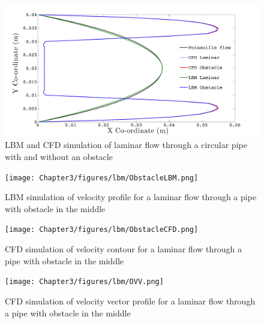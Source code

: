\begin{figure}[htbp]
\centering
\includegraphics[scale=0.4]{Chapter3/figures/lbm/LBMCFD.pdf}
\caption{LBM and CFD simulation of laminar flow through a circular pipe with and without an obstacle}
\label{fig:LBM}
\end{figure}

\begin{figure}[htbp]
\centering
\texttt{[image: Chapter3/figures/lbm/ObstacleLBM.png]}
\caption{LBM simulation of velocity profile for a laminar flow through a pipe with obstacle in the middle}
\label{fig:Obstacle}
\end{figure}

\begin{figure}[htbp]
\centering
\texttt{[image: Chapter3/figures/lbm/ObstacleCFD.png]}
\caption{CFD simulation of velocity contour for a laminar flow through a pipe with obstacle in the middle}
\label{fig:obsvc}
\end{figure}

\begin{figure}[htbp]
\centering
\texttt{[image: Chapter3/figures/lbm/OVV.png]}
\caption{CFD simulation of velocity vector profile for a laminar flow through a pipe with obstacle in the middle}
\label{fig:obsvv}
\end{figure}

